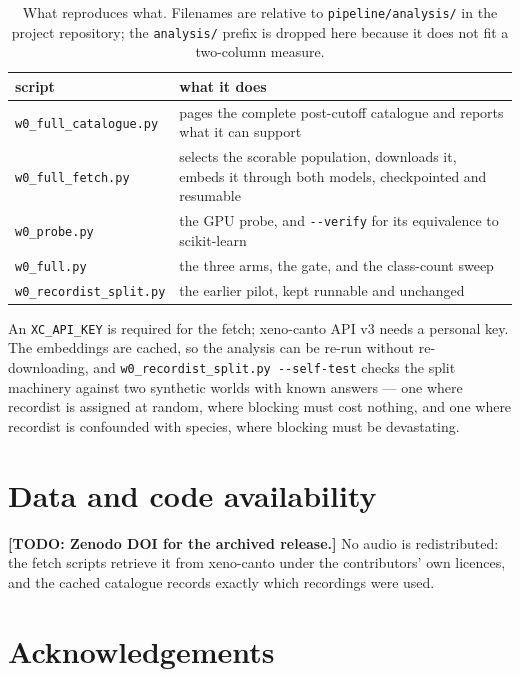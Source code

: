 \documentclass[10pt,twocolumn,a4paper]{article}
\newcommand{\todo}[1]{{\color{red}\textbf{[TODO: #1]}}}
\begin{document}
\begin{table}[t]
\footnotesize
\setlength{\tabcolsep}{4pt}
\caption{What reproduces what. Filenames are relative to \texttt{pipeline/analysis/} in the
project repository; the \texttt{analysis/} prefix is dropped here because it does not fit a
two-column measure.}
\label{tab:repro}
\begin{tabular}{L{3.6cm} L{3.9cm}}
\toprule
script & what it does \\
\midrule
\texttt{w0\_full\_catalogue.py}
  & pages the complete post-cutoff catalogue and reports what it can support \\
\texttt{w0\_full\_fetch.py}
  & selects the scorable population, downloads it, embeds it through both models,
    checkpointed and resumable \\
\texttt{w0\_probe.py}
  & the GPU probe, and \texttt{-{}-verify} for its equivalence to scikit-learn \\
\texttt{w0\_full.py}
  & the three arms, the gate, and the class-count sweep \\
\texttt{w0\_recordist\_split.py}
  & the earlier pilot, kept runnable and unchanged \\
\bottomrule
\end{tabular}
\end{table}

An \texttt{XC\_API\_KEY} is required for the fetch; xeno-canto API v3 needs a personal key.
The embeddings are cached, so the analysis can be re-run without re-downloading, and
\texttt{w0\_recordist\_split.py -{}-self-test} checks the split machinery against two
synthetic worlds with known answers --- one where recordist is assigned at random, where
blocking must cost nothing, and one where recordist is confounded with species, where
blocking must be devastating.

\section*{Data and code availability}

\todo{Zenodo DOI for the archived release.} No audio is redistributed: the fetch scripts
retrieve it from xeno-canto under the contributors' own licences, and the cached catalogue
records exactly which recordings were used.

\section*{Acknowledgements}
\end{document}
